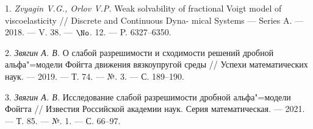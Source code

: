 

1. {\it Zvyagin V.G., Orlov V.P.} Weak solvability of fractional Voigt model of viscoelasticity // Discrete and Continuous Dyna- mical Systems --- Series A. --- 2018. --- V. 38. --- $\No$. 12. --- P. 6327--6350.

2. {\it Звягин А. В.} О слабой разрешимости и сходимости решений дробной альфа"=модели Фойгта движения вязкоупругой среды // Успехи математических наук. --- 2019. --- Т. 74. --- №. 3. --- С. 189--190.

3. {\it Звягин А. В.} Исследование слабой разрешимости дробной альфа"=модели Фойгта // Известия Российской академии наук. Серия математическая. --- 2021. --- Т. 85. --- №. 1. --- С. 66--97.

